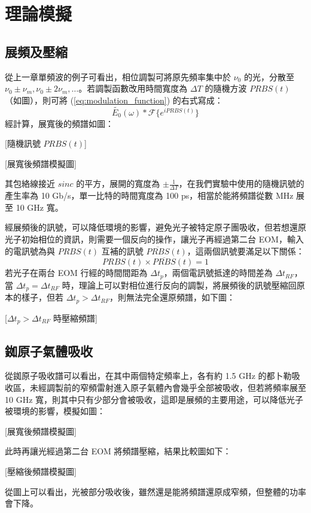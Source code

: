 \documentclass[class=NCU_thesis, crop=false]{standalone}
\begin{document}
\chapter{理論模擬}
\section{展頻及壓縮}
從上一章單頻波的例子可看出，相位調製可將原先頻率集中於 $\nu_{0}$ 的光，分散至 $\nu_{0}\pm\nu_{m}, \nu_{0}\pm2\nu_{m},\dots$。若調製函數改用時間寬度為 $\Delta T$ 的隨機方波 $PRBS(t)$ （如圖），則可將 (\ref{eq:modulation_function}) 的右式寫成：
\begin{equation}
    \tilde{E_{0}}(\omega)*\mathscr{F}\{{e^{i PRBS(t)}}\}
\end{equation}
經計算，展寬後的頻譜如圖：

[隨機訊號 $PRBS(t)$]

[展寬後頻譜模擬圖]

其包絡線接近 $sinc$ 的平方，展開的寬度為 $\pm\frac{1}{\Delta T}$，在我們實驗中使用的隨機訊號的產生率為 10 Gb/s，單一比特的時間寬度為 100 ps，相當於能將頻譜從數 MHz 展至 10 GHz 寬。

經展頻後的訊號，可以降低環境的影響，避免光子被特定原子團吸收，但若想還原光子初始相位的資訊，則需要一個反向的操作，讓光子再經過第二台 EOM，輸入的電訊號為與 $PRBS(t)$ 互補的訊號 $\overline{PRBS}(t)$，這兩個訊號要滿足以下關係：
\begin{equation}
    PRBS(t)\times \overline{PRBS}(t)=1
\end{equation}
若光子在兩台 EOM 行經的時間間距為 $\Delta t_{p}$，兩個電訊號抵達的時間差為 $\Delta t_{RF}$，當 $\Delta t_{p}=\Delta t_{RF}$ 時，理論上可以對相位進行反向的調製，將展頻後的訊號壓縮回原本的樣子，但若 $\Delta t_{p}>\Delta t_{RF}$，則無法完全還原頻譜，如下圖：

[$\Delta t_{p}>\Delta t_{RF}$ 時壓縮頻譜]

\section{銣原子氣體吸收}
從銣原子吸收譜可以看出，在其中兩個特定頻率上，各有約 1.5 GHz 的都卜勒吸收區，未經調製前的窄頻雷射進入原子氣體內會幾乎全部被吸收，但若將頻率展至 10 GHz 寬，則其中只有少部分會被吸收，這即是展頻的主要用途，可以降低光子被環境的影響，模擬如圖：

[展寬後頻譜模擬圖]

此時再讓光經過第二台 EOM 將頻譜壓縮，結果比較圖如下：

[壓縮後頻譜模擬圖]

從圖上可以看出，光被部分吸收後，雖然還是能將頻譜還原成窄頻，但整體的功率會下降。
\end{document}
